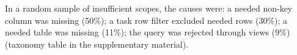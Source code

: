 In a random sample of \taxN{} insufficient scopes, the causes were: a needed non-key column was missing (50\%); a task row filter excluded needed rows (30\%); a needed table was missing (11\%); the query was rejected through views (9\%) (taxonomy table in the supplementary material).
